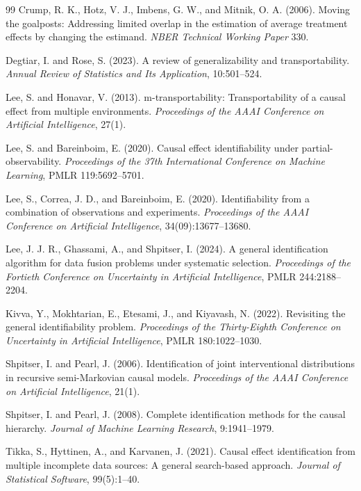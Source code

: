 \documentclass[11pt]{article}
\theoremstyle{definition}
\theoremstyle{plain}
\theoremstyle{remark}
\begin{document}
\begin{thebibliography}{99}
Crump, R. K., Hotz, V. J., Imbens, G. W., and Mitnik, O. A. (2006).
Moving the goalposts: Addressing limited overlap in the estimation of average
treatment effects by changing the estimand.
\emph{NBER Technical Working Paper} 330.

Degtiar, I. and Rose, S. (2023).
A review of generalizability and transportability.
\emph{Annual Review of Statistics and Its Application}, 10:501--524.

Lee, S. and Honavar, V. (2013).
m-transportability: Transportability of a causal effect from multiple
environments.
\emph{Proceedings of the AAAI Conference on Artificial Intelligence}, 27(1).

Lee, S. and Bareinboim, E. (2020).
Causal effect identifiability under partial-observability.
\emph{Proceedings of the 37th International Conference on Machine Learning},
PMLR 119:5692--5701.

Lee, S., Correa, J. D., and Bareinboim, E. (2020).
Identifiability from a combination of observations and experiments.
\emph{Proceedings of the AAAI Conference on Artificial Intelligence},
34(09):13677--13680.

Lee, J. J. R., Ghassami, A., and Shpitser, I. (2024).
A general identification algorithm for data fusion problems under systematic
selection.
\emph{Proceedings of the Fortieth Conference on Uncertainty in Artificial
Intelligence}, PMLR 244:2188--2204.

Kivva, Y., Mokhtarian, E., Etesami, J., and Kiyavash, N. (2022).
Revisiting the general identifiability problem.
\emph{Proceedings of the Thirty-Eighth Conference on Uncertainty in
Artificial Intelligence}, PMLR 180:1022--1030.

Shpitser, I. and Pearl, J. (2006).
Identification of joint interventional distributions in recursive
semi-Markovian causal models.
\emph{Proceedings of the AAAI Conference on Artificial Intelligence}, 21(1).

Shpitser, I. and Pearl, J. (2008).
Complete identification methods for the causal hierarchy.
\emph{Journal of Machine Learning Research}, 9:1941--1979.

Tikka, S., Hyttinen, A., and Karvanen, J. (2021).
Causal effect identification from multiple incomplete data sources: A general
search-based approach.
\emph{Journal of Statistical Software}, 99(5):1--40.
\end{thebibliography}
\end{document}
